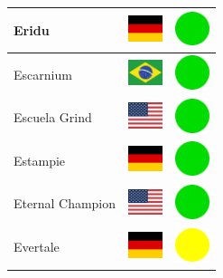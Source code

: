 \documentclass[12pt, a4paper, twoside]{report}
\begin{document}
\begin{center}
\begin{longtable}{|p{5cm}|p{2cm}|p{2cm}|}
 Eridu                                                      & \includegraphics[width=1cm]{../img/flags/de} &   \includegraphics[width=1cm]{../likes/y} \\ \hline
 Escarnium                                                  & \includegraphics[width=1cm]{../img/flags/br} &   \includegraphics[width=1cm]{../likes/y} \\ \hline
 Escuela Grind                                              & \includegraphics[width=1cm]{../img/flags/us} &   \includegraphics[width=1cm]{../likes/y} \\ \hline
 Estampie                                                   & \includegraphics[width=1cm]{../img/flags/de} &   \includegraphics[width=1cm]{../likes/y} \\ \hline
 Eternal Champion                                           & \includegraphics[width=1cm]{../img/flags/us} &   \includegraphics[width=1cm]{../likes/y} \\ \hline
 Evertale                                                   & \includegraphics[width=1cm]{../img/flags/de} &   \includegraphics[width=1cm]{../likes/m} \\ \hline

\end{longtable}
\end{center}
\end{document}
